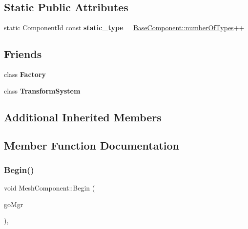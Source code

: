 \subsection*{Static Public Attributes}
\begin{DoxyCompactItemize}
\item 
\mbox{\label{classMeshComponent_ad92895ae37febf972adbd1ad6fed1854}} 
static Component\+Id const {\bfseries static\+\_\+type} = \hyperlink{classBaseComponent_a084ade347bc71a7f0d3b17ecdc2225a4}{Base\+Component\+::number\+Of\+Types}++
\end{DoxyCompactItemize}
\subsection*{Friends}
\begin{DoxyCompactItemize}
\item 
\mbox{\label{classMeshComponent_a328c093d609680cca505905c6d49901a}} 
class {\bfseries Factory}
\item 
\mbox{\label{classMeshComponent_a318469cfd809ba3993eb0331cba48707}} 
class {\bfseries Transform\+System}
\end{DoxyCompactItemize}
\subsection*{Additional Inherited Members}


\subsection{Member Function Documentation}
\mbox{\label{classMeshComponent_a7ec68255fed493e34021fc15cec12581}} 
\subsubsection{\texorpdfstring{Begin()}{Begin()}}
{\footnotesize\ttfamily void Mesh\+Component\+::\+Begin (\begin{DoxyParamCaption}\item[{\hyperlink{classGameObjectManager}{Game\+Object\+Manager} $\ast$}]{go\+Mgr }\end{DoxyParamCaption})\hspace{0.3cm}{\ttfamily [override]}, {\ttfamily [virtual]}}



